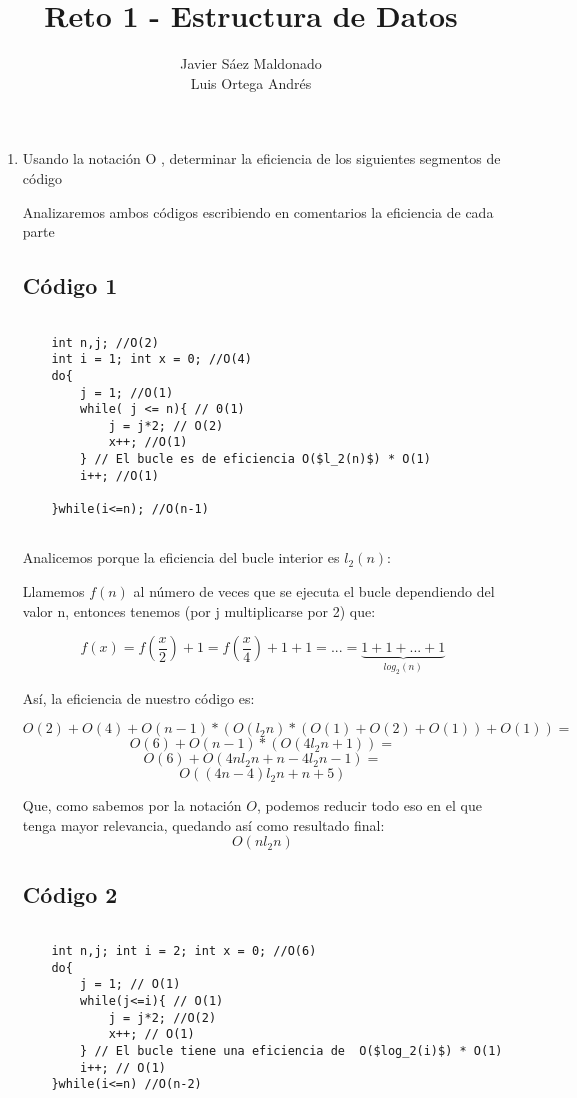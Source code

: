 \documentclass[11pt]{article}
\title{\textbf{Reto 1 - Estructura de Datos}}
\author{Javier Sáez Maldonado\\
Luis Ortega Andrés}
\date{}
\begin{document}
\maketitle

\begin{enumerate}
\item  Usando la notación O
, determinar la eficiencia de los siguientes segmentos de
código

Analizaremos ambos códigos escribiendo en comentarios la eficiencia de cada parte

\subsection*{Código 1}

\begin{verbatim}

	int n,j; //O(2)
	int i = 1; int x = 0; //O(4)
	do{
		j = 1; //O(1)
		while( j <= n){ // 0(1) 
			j = j*2; // O(2)
			x++; //O(1)
		} // El bucle es de eficiencia O($l_2(n)$) * O(1)
		i++; //O(1)
		
	}while(i<=n); //O(n-1)
	
\end{verbatim}

Analicemos porque la eficiencia del bucle interior es $l_2(n)$:

Llamemos $f(n)$ al número de veces que se ejecuta el bucle dependiendo del valor n,  entonces tenemos (por j multiplicarse por 2) que:

\[ f(x) = f\left(\frac{x}{2}\right) + 1 = f\left(\frac{x}{4}\right) + 1 + 1 = ... = \underbrace{1 + 1 + ... + 1}_{log_2 (n)} \]

Así, la eficiencia de nuestro código es:

\[
O(2) + O(4) + O(n-1)*(O(l_2n)*(O(1)+O(2)+O(1))+O(1)) = 
\]
\[
O(6) + O(n-1)*(O(4l_2n + 1)) = 
\]
\[
O(6) + O(4nl_2n + n - 4l_2n - 1 ) = 
\]
\[
O((4n - 4)l_2n + n + 5)
\]

Que, como sabemos por la notación $O$, podemos reducir todo eso en el que tenga mayor relevancia, quedando así como resultado final: 
\[O(nl_2n)\]
\subsection*{Código 2}

\begin{verbatim}
	
	int n,j; int i = 2; int x = 0; //O(6)
	do{
		j = 1; // O(1)
		while(j<=i){ // O(1)
			j = j*2; //O(2) 
			x++; // O(1)
		} // El bucle tiene una eficiencia de  O($log_2(i)$) * O(1)
		i++; // O(1)
	}while(i<=n) //O(n-2)
\end{verbatim}


\end{enumerate}
\end{document}
